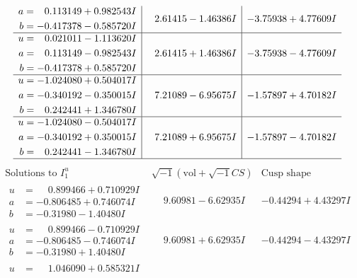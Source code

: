 \documentclass[1p]{elsarticle_modified}
\theoremstyle{definition}
\newcommand{\I}{\sqrt{-1}}
\begin{document}
$$\begin{array}{c|c|c}
\begin{aligned}
a &= \phantom{-}0.113149 + 0.982543 I \\
b &= -0.417378 - 0.585720 I\end{aligned}
 & \phantom{-}2.61415 - 1.46386 I & -3.75938 + 4.77609 I \\ \hline\begin{aligned}
u &= \phantom{-}0.021011 - 1.113620 I \\
a &= \phantom{-}0.113149 - 0.982543 I \\
b &= -0.417378 + 0.585720 I\end{aligned}
 & \phantom{-}2.61415 + 1.46386 I & -3.75938 - 4.77609 I \\ \hline\begin{aligned}
u &= -1.024080 + 0.504017 I \\
a &= -0.340192 - 0.350015 I \\
b &= \phantom{-}0.242441 + 1.346780 I\end{aligned}
 & \phantom{-}7.21089 - 6.95675 I & -1.57897 + 4.70182 I \\ \hline\begin{aligned}
u &= -1.024080 - 0.504017 I \\
a &= -0.340192 + 0.350015 I \\
b &= \phantom{-}0.242441 - 1.346780 I\end{aligned}
 & \phantom{-}7.21089 + 6.95675 I & -1.57897 - 4.70182 I\\
 \hline 
 \end{array}$$\newpage$$\begin{array}{c|c|c}  
\text{Solutions to }I^u_{1}& \I (\text{vol} + \sqrt{-1}CS) & \text{Cusp shape}\\
 \hline 
\begin{aligned}
u &= \phantom{-}0.899466 + 0.710929 I \\
a &= -0.806485 + 0.746074 I \\
b &= -0.31980 - 1.40480 I\end{aligned}
 & \phantom{-}9.60981 - 6.62935 I & -0.44294 + 4.43297 I \\ \hline\begin{aligned}
u &= \phantom{-}0.899466 - 0.710929 I \\
a &= -0.806485 - 0.746074 I \\
b &= -0.31980 + 1.40480 I\end{aligned}
 & \phantom{-}9.60981 + 6.62935 I & -0.44294 - 4.43297 I \\ \hline\begin{aligned}
u &= \phantom{-}1.046090 + 0.585321 I \\

\end{aligned}
\end{array}$$
\end{document}
